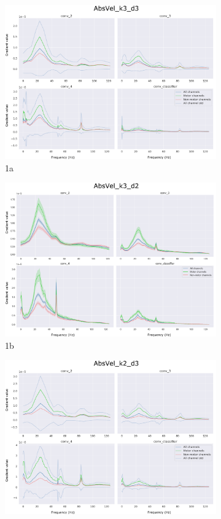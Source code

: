 \begin{figure}
\begin{subfigure}{.5\textwidth}
  \centering
  \includegraphics[width=.8\linewidth]{img/ch4/absVel-k3-d3}
  \caption{1a}
  \label{fig:absVel-k3-d3}
\end{subfigure}%
\begin{subfigure}{.5\textwidth}
  \centering
  \includegraphics[width=.8\linewidth]{img/ch4/absVel-k3-d2}
  \caption{1b}
  \label{fig:absVel-k3-d2}
\end{subfigure}
\begin{subfigure}{.5\textwidth}
  \centering
  \includegraphics[width=.8\linewidth]{img/ch4/absVel-k2-d3}

\end{subfigure}
\end{figure}
